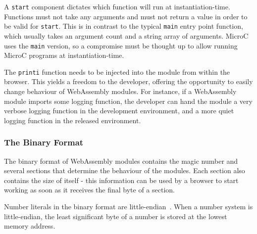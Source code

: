 \documentclass[a4paper]{article}
\begin{document}
A \texttt{start} component dictates which function will run at instantiation-time. Functions must not take any arguments and must not return a value in order to be valid for \texttt{start}. This is in contrast to the typical \texttt{main} entry point function, which usually takes an argument count and a string array of arguments. MicroC uses the \texttt{main} version, so a compromise must be thought up to allow running MicroC programs at instantiation-time.

The \texttt{printi} function needs to be injected into the module from within the browser. This yields a freedom to the developer, offering the opportunity to easily change behaviour of WebAssembly modules. For instance, if a WebAssembly module imports some logging function, the developer can hand the module a very verbose logging function in the development environment, and a more quiet logging function in the released environment.

\subsubsection{The Binary Format}
\label{sec:problem-analysis:webassembly:binary}
The binary format of WebAssembly modules contains the magic number and several sections that determine the behaviour of the modules. Each section also contains the size of itself - this information can be used by a browser  to start working as soon as it receives the final byte of a section.

Number literals in the binary format are little-endian~\cite{website:wasm-binary-encoding}. When a number system is little-endian, the least significant byte of a number is stored at the lowest memory address.
\end{document}
